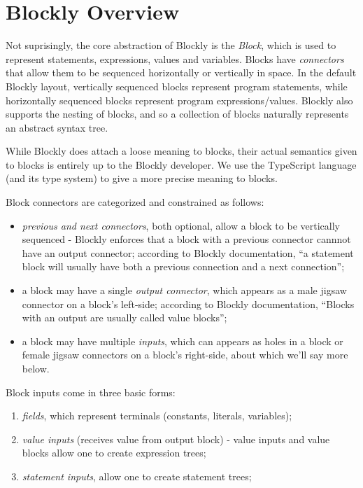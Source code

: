 \section{Blockly Overview}
\label{sec:blockly}

Not suprisingly, the core abstraction of Blockly is the \emph{Block},
which is used to represent statements, expressions, values and variables.  
Blocks have \emph{connectors} that allow them to be sequenced
horizontally or vertically in space.  In the default Blockly
layout, vertically sequenced blocks
represent program statements, while horizontally
sequenced blocks represent program expressions/values.
Blockly also supports the nesting of blocks, and so a collection of
blocks naturally represents an abstract syntax tree. 

While Blockly does attach a loose meaning to blocks,
their actual semantics given to blocks is entirely up to the Blockly developer.
We use the TypeScript language (and its type system) to 
give a more precise meaning to blocks. 

Block connectors are categorized and constrained as follows:
\begin{itemize}

\item \emph{previous and next connectors}, both optional, allow a block to be vertically sequenced - Blockly
  enforces that a block with a previous connector cannnot have an output connector; according
  to Blockly documentation, ``a statement block will usually have both a previous connection and 
  a next connection'';

\item a block may have a single \emph{output connector}, 
      which appears as a male jigsaw connector on a block's left-side; according to 
      Blockly documentation, ``Blocks with an output are usually called value blocks'';

\item a block may have multiple \emph{inputs}, which can appears as holes in a block
      or female jigsaw connectors on a block's right-side, about which we'll say more below. 
\end{itemize}

Block inputs come in three basic forms:
\begin{enumerate}
  \item \emph{fields}, which represent terminals (constants, literals, variables);
  \item \emph{value inputs} (receives value from output block) - value inputs
      and value blocks allow one to create expression trees;
  \item \emph{statement inputs}, allow one to create statement trees;
\end{enumerate}
